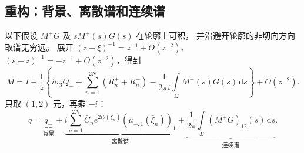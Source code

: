 \documentclass[lang=cn,scheme=chinese,mode=simple,device=normal,color=blue,
math=cm,thmcnt=section,12pt]{elegantbook}
\newcommand{\dd}{\,\mathrm{d}}
\newcommand{\eqq}[2]{\tag{#1}\label{eq:#1}#2}
\begin{document}
\subsection{重构：背景、离散谱和连续谱}
以下假设 $M^+G$ 及 $sM^+(s)G(s)$ 在轮廓上可积，
并沿避开轮廓的非切向方向取谱无穷远。
展开 $(z-\xi)^{-1}=z^{-1}+O(z^{-2})$、
$(s-z)^{-1}=-z^{-1}+O(z^{-2})$，得到
\begin{equation}
    \eqq{6.7.5}{M=I+\dfrac{1}{z}\left\{i\sigma_3Q_-+
        \sum\limits_{n=1}^{2N}(R_n^++R_n^-)
        -\dfrac{1}{2\pi i}\int\limits_\Sigma M^+(s)G(s)\dd s\right\}+O(z^{-2}).}
\end{equation}
只取 $(1,2)$ 元，再乘 $-i$：
\begin{equation}
    \eqq{6.7.6}{q=\underbrace{q_-}_{\text{背景}}
        +\underbrace{i\sum\limits_{n=1}^{2N}\bar C_ne^{2i\theta(\bar\xi_n)}
            (\mu_{-,1}(\bar\xi_n))_1}_{\text{离散谱}}
        +\underbrace{\dfrac{1}{2\pi}\int\limits_\Sigma(M^+G)_{12}(s)\dd s}_{\text{连续谱}}.}
\end{equation}
\end{document}
